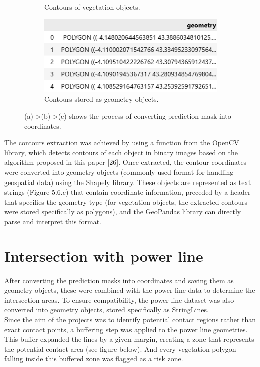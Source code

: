 \begin{figure}[H]
\begin{subfigure}{0.49\textwidth}
\caption{Contours of vegetation objects.}
\label{fig:right}
\end{subfigure}
\begin{subfigure}{0.60\textwidth}
\centering
\includegraphics[width = \textwidth]{IMAGENES/IMG21-Contour3.png}
\caption{Contours stored as geometry objects.}
\label{fig:right}
\end{subfigure}
\caption{(a)->(b)->(c) shows the process of converting prediction mask into coordinates.}
\label{fig:combined}
\end{figure}

The contours extraction was achieved by using a function from the OpenCV library, which detects contours of each object in binary images based on the algorithm proposed in this paper [26]. Once extracted, the contour coordinates were converted into geometry objects (commonly used format for handling geospatial data) using the Shapely library. These objects are represented as text strings (Figure 5.6.c) that contain coordinate information, preceded by a header that specifies the geometry type (for vegetation objects, the extracted contours were stored specifically as polygons), and the GeoPandas library can directly parse and interpret this format. 


\section{Intersection with power line}
After converting the prediction masks into coordinates and saving them as geometry objects, these were combined with the power line data to determine the intersection areas. To ensure compatibility, the power line dataset was also converted into geometry objects, stored specifically as StringLines. \\

Since the aim of the projects was to identify potential contact regions rather than exact contact points, a buffering step was applied to the power line geometries. This buffer expanded the lines by a given margin, creating a zone that represents the potential contact area (see figure below). And every vegetation polygon falling inside this buffered zone was flagged as a risk zone. 

